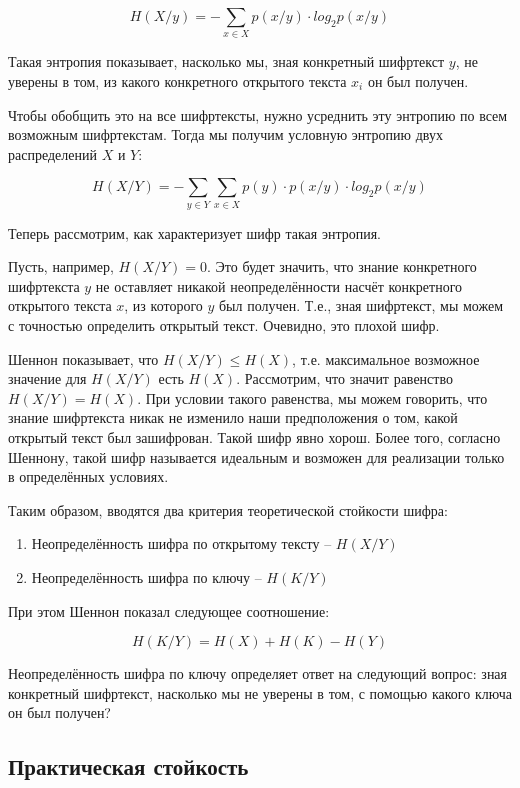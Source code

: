 $$ H(X/y) = -\sum_{x \in X} p(x/y) \cdot log_2p(x/y) $$ 

Такая энтропия показывает, насколько мы, зная конкретный шифртекст $y$, не уверены в том, из какого конкретного открытого текста $x_i$ он был получен.

Чтобы обобщить это на все шифртексты, нужно усреднить эту энтропию по всем возможным шифртекстам. Тогда мы получим условную энтропию двух распределений $X$ и $Y$:

$$ H(X/Y) = -\sum_{y \in Y} \sum_{x \in X} p(y) \cdot p(x/y) \cdot log_2p(x/y) $$ 

Теперь рассмотрим, как характеризует шифр такая энтропия.

Пусть, например, $H(X/Y) = 0$. Это будет значить, что знание конкретного шифртекста $y$ не оставляет никакой неопределённости насчёт конкретного открытого текста $x$, из которого $y$ был получен. Т.е., зная шифртекст, мы можем с точностью определить открытый текст. Очевидно, это плохой шифр.

Шеннон показывает, что $H(X/Y) \leq H(X)$, т.е. максимальное возможное значение для $H(X/Y)$ есть $H(X)$. Рассмотрим, что значит равенство $H(X/Y) = H(X)$. При условии такого равенства, мы можем говорить, что знание шифртекста никак не изменило наши предположения о том, какой открытый текст был зашифрован. Такой шифр явно хорош. Более того, согласно Шеннону, такой шифр называется идеальным и возможен для реализации только в определённых условиях.

Таким образом, вводятся два критерия теоретической стойкости шифра:

\begin{enumerate}
	\item Неопределённость шифра по открытому тексту -- $H(X/Y)$
	\item Неопределённость шифра по ключу -- $H(K/Y)$
\end{enumerate}

При этом Шеннон показал следующее соотношение: 

$$ H(K/Y) = H(X) + H(K) - H(Y) $$

Неопределённость шифра по ключу определяет ответ на следующий вопрос: зная конкретный шифртекст, насколько мы не уверены в том, с помощью какого ключа он был получен?

\subsection{Практическая стойкость}

